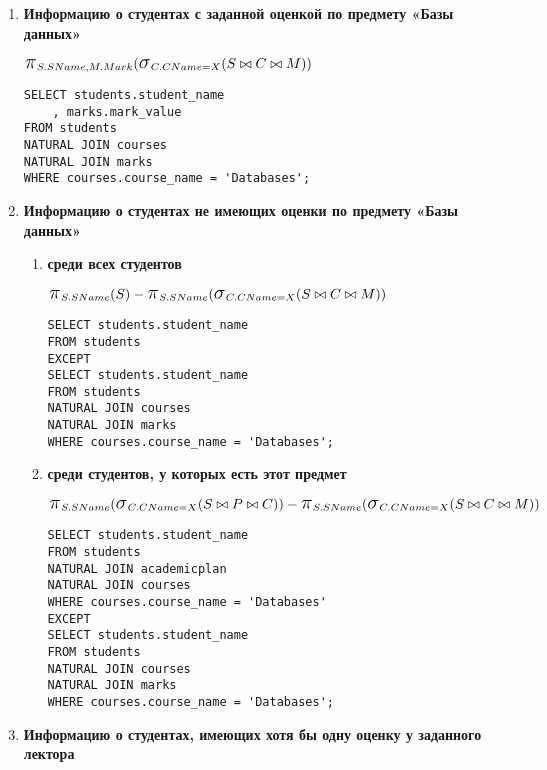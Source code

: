 \documentclass[12pt]{article}
\newcommand{\select}{\mbox{\Large$\sigma$}}
\newcommand{\project}{\mbox{\Large$\pi$}}
\begin{document}
\begin{enumerate}	
   \item \textbf{Информацию о студентах с заданной оценкой по предмету «Базы данных»}

   		$ \project_{S.SName, M.Mark} (\select_{C.CName = X } (S \bowtie C \bowtie M)) $
   		
   		 \begin{verbatim}
SELECT students.student_name
	, marks.mark_value
FROM students 
NATURAL JOIN courses
NATURAL JOIN marks 
WHERE courses.course_name = 'Databases';
		\end{verbatim}

   		
    \item \textbf{Информацию о студентах не имеющих оценки по предмету «Базы данных»}

       	\begin{enumerate}	
   			\item \textbf{среди всех студентов}
   			   			
   				$ \project_{S.SName} (S) - \project_{S.SName} (\select_{C.CName = X } (S \bowtie C \bowtie M)) $
   				
				\begin{verbatim}
SELECT students.student_name
FROM students 
EXCEPT
SELECT students.student_name
FROM students 
NATURAL JOIN courses
NATURAL JOIN marks 
WHERE courses.course_name = 'Databases';
				\end{verbatim}
   			
   			\item \textbf{среди студентов, у которых есть этот предмет}
   			
   				$ \project_{S.SName} (\select_{C.CName = X } (S \bowtie P \bowtie C)) - \project_{S.SName} (\select_{C.CName = X } (S \bowtie C \bowtie M)) $
   			
				\begin{verbatim}
SELECT students.student_name
FROM students 
NATURAL JOIN academicplan
NATURAL JOIN courses
WHERE courses.course_name = 'Databases'
EXCEPT
SELECT students.student_name
FROM students 
NATURAL JOIN courses
NATURAL JOIN marks 
WHERE courses.course_name = 'Databases';
				\end{verbatim}
   			
		\end{enumerate}	
       
    
    \item \textbf{Информацию о студентах, имеющих хотя бы одну оценку у заданного лектора}
    

\end{enumerate}
\end{document}
